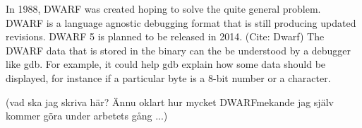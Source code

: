 In 1988, DWARF was created hoping to solve the quite general problem. DWARF is
a language agnostic debugging format that is still producing updated revisions.
DWARF 5 is planned to be released in 2014. (Cite: Dwarf) The DWARF data that is
stored in the binary can the be understood by a debugger like gdb. For example,
it could help gdb explain how some data should be displayed, for instance if a
particular byte is a 8-bit number or a character. %


(vad ska jag skriva här? Ännu oklart hur mycket DWARFmekande jag själv kommer
göra under arbetets gång ...)


